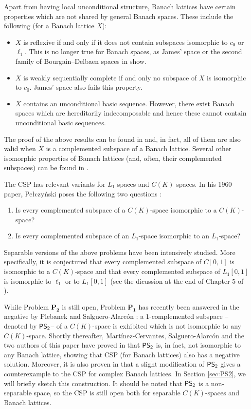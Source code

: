 \documentclass[11pt]{amsart}
\theoremstyle{definition}
\numberwithin{equation}{section}
\newcommand\PS{{\normalfont\textsf{PS}}_\textsf{2}}
\begin{document}
Apart from having local unconditional structure, Banach lattices have certain properties which are not shared by general  Banach spaces. These include the following (for a Banach lattice $X$):
\begin{itemize}
    \item $X$ is reflexive if and only if it does not contain subspaces isomorphic to $c_0$ or $\ell_1$. This is no longer true for Banach spaces, as James' space \cite{J51} or the second family of Bourgain–Delbaen spaces in \cite{BD} show.
    \item $X$ is weakly sequentially complete if and only no subspace of $X$ is isomorphic to $c_0$. James' space also fails this property.
    \item $X$ contains an unconditional basic sequence. However, there exist Banach spaces which are hereditarily indecomposable \cite{GM} and hence these cannot contain unconditional basic sequences.  
\end{itemize}
The proof of the above results can be found in \cite[Section 1.c]{LT2-book} and, in fact, all of them are also valid when $X$ is a complemented subspace of a Banach lattice. Several other isomorphic properties of Banach lattices (and, often, their complemented subspaces) can be found in \cite{BL76, BVL, FJT75, Ghoussoub, Johnson, Lacey-lust, T72}. 


The CSP has relevant variants for $L_1$-spaces and $C(K)$-spaces. In his 1960 paper, Pe{\l{}}czy{\'{n}}ski poses the following two questions \cite[p. 210]{P60}:
\begin{enumerate}
    \item[$\mathbf{P_1}.$] Is every complemented subspace of a $C(K)$-space isomorphic to a $C(K)$-space?
    \item[$\mathbf{P_2}.$] Is every complemented subspace of an $L_1$-space isomorphic to an $L_1$-space?
\end{enumerate}
Separable versions of the above problems have been intensively studied. More specifically, it is conjectured that every complemented subspace of $C[0,1]$ is isomorphic to a $C(K)$-space and that every complemented subspace of $L_1[0,1]$ is isomorphic to $\ell_1$ or to $L_1[0,1]$ (see the dicussion at the end of Chapter 5 of \cite{AK-book}).

While Problem $\mathbf{P_2}$ is still open, Problem $\mathbf{P_1}$ has recently been answered in the negative by Plebanek and Salguero-Alarcón \cite{PS2}: a $1$-complemented subspace --denoted by $\PS$-- of a $C(K)$-space is exhibited which is not isomorphic to any $C(K)$-space. Shortly thereafter, Martínez-Cervantes, Salguero-Alarcón and the two authors of this paper have proved in \cite{dHMST23} that $\PS$ is, in fact, not isomorphic to any Banach lattice, showing that CSP (for Banach lattices) also has a negative solution. Moreover, it is also proven in \cite{dHMST23} that a slight modification of $\PS$ gives a counterexample to the CSP for complex Banach lattices. In Section \ref{sec:PS2}, we will briefly sketch this construction. It should be noted that $\PS$ is a non-separable space, so the CSP is still open both for separable $C(K)$-spaces and Banach lattices.
\end{document}
